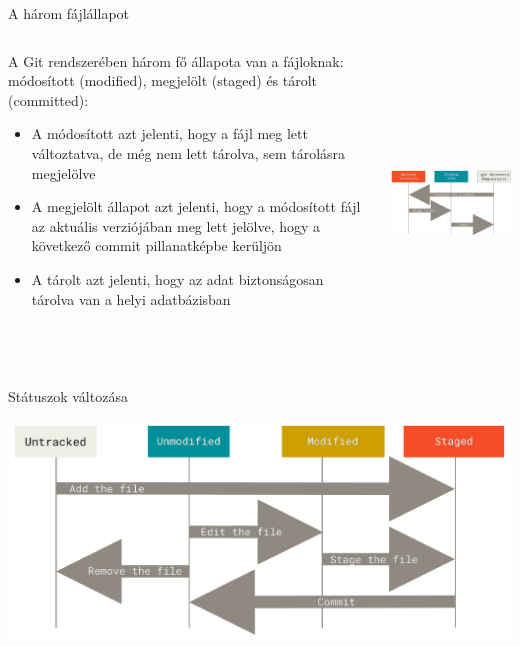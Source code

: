 \documentclass[english, aspectratio=169]{beamer}
\begin{document}
\begin{frame}{A három fájlállapot}
\begin{columns}
\begin{column}{0.5\textwidth}
A Git rendszerében három fő állapota van a fájloknak: módosított (modified), megjelölt (staged) és tárolt (committed):
\begin{itemize}
	\item A módosított azt jelenti, hogy a fájl meg lett változtatva, de még nem lett tárolva, sem tárolásra megjelölve
	\item A megjelölt állapot azt jelenti, hogy a módosított fájl az aktuális verziójában meg lett jelölve, hogy a következő commit pillanatképbe kerüljön
	\item A tárolt azt jelenti, hogy az adat biztonságosan tárolva van a helyi adatbázisban
\end{itemize}
\end{column}
\begin{column}{0.6\textwidth}
\begin{center}
\includegraphics[width=8cm, height=8cm, keepaspectratio]{images/git_2.png}
\end{center}
\end{column}
\end{columns}
\end{frame}

\begin{frame}{Státuszok változása}
\begin{center}
\includegraphics[width=14cm, keepaspectratio]{images/git_3.png}
\end{center}
\end{frame}
\end{document}
